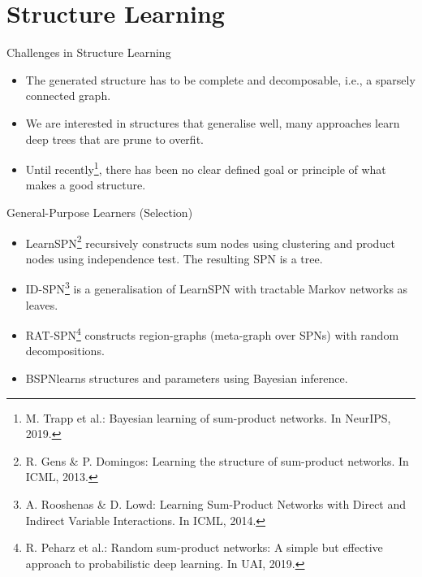 \section{Structure Learning}

\begin{frame}{Challenges in Structure Learning}
\begin{itemize}
    \item The generated structure has to be complete and decomposable, i.e., a sparsely connected graph.
    \item We are interested in structures that generalise well, many approaches learn deep trees that are prune to overfit.
    \item Until recently\footnote{\scriptsize M. Trapp et al.: Bayesian learning of sum-product networks. In NeurIPS, 2019.\label{fn:bspn}}, there has been no clear defined goal or principle of what makes a good structure.
\end{itemize}
\end{frame}


\begin{frame}{General-Purpose Learners (Selection)}{}
\begin{itemize}
    \item LearnSPN\footnote{\tiny R. Gens \& P. Domingos: Learning the structure of sum-product networks. In ICML, 2013.} recursively constructs sum nodes using clustering and product nodes using independence test. The resulting SPN is a tree.
    \item ID-SPN\footnote{\tiny A. Rooshenas \& D. Lowd: Learning Sum-Product Networks with Direct and Indirect Variable Interactions. In ICML, 2014.} is a generalisation of LearnSPN with tractable Markov networks as leaves.
    \item RAT-SPN\footnote{\tiny R. Peharz et al.: Random sum-product networks: A simple but effective approach to probabilistic deep learning. In UAI, 2019.} constructs region-graphs (meta-graph over SPNs) with random decompositions.
    \item BSPN\footnotemark[8] learns structures and parameters using Bayesian inference.
\end{itemize}
\end{frame}

%

